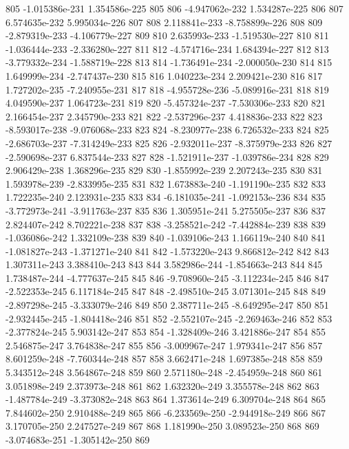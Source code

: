 \documentclass{article}
\begin{document}
\begin{Schunk}
\begin{Soutput}
805  -1.015386e-231  1.354586e-225  805
806  -4.947062e-232  1.534287e-225  806
807   6.574635e-232  5.995034e-226  807
808   2.118841e-233 -8.758899e-226  808
809  -2.879319e-233 -4.106779e-227  809
810   2.635993e-233 -1.519530e-227  810
811  -1.036444e-233 -2.336280e-227  811
812  -4.574716e-234  1.684394e-227  812
813  -3.779332e-234 -1.588719e-228  813
814  -1.736491e-234 -2.000050e-230  814
815   1.649999e-234 -2.747437e-230  815
816   1.040223e-234  2.209421e-230  816
817   1.727202e-235 -7.240955e-231  817
818  -4.955728e-236 -5.089916e-231  818
819   4.049590e-237  1.064723e-231  819
820  -5.457324e-237 -7.530306e-233  820
821   2.166454e-237  2.345790e-233  821
822  -2.537296e-237  4.418836e-233  822
823  -8.593017e-238 -9.076068e-233  823
824  -8.230977e-238  6.726532e-233  824
825  -2.686703e-237 -7.314249e-233  825
826  -2.932011e-237 -8.375979e-233  826
827  -2.590698e-237  6.837544e-233  827
828  -1.521911e-237 -1.039786e-234  828
829   2.906429e-238  1.368296e-235  829
830  -1.855992e-239  2.207243e-235  830
831   1.593978e-239 -2.833995e-235  831
832   1.673883e-240 -1.191190e-235  832
833   1.722235e-240  2.123931e-235  833
834  -6.181035e-241 -1.092153e-236  834
835  -3.772973e-241 -3.911763e-237  835
836   1.305951e-241  5.275505e-237  836
837   2.824407e-242  8.702221e-238  837
838  -3.258521e-242 -7.442884e-239  838
839  -1.036086e-242  1.332109e-238  839
840  -1.039106e-243  1.166119e-240  840
841  -1.081827e-243 -1.371271e-240  841
842  -1.573220e-243  9.866812e-242  842
843   1.307311e-243  3.388410e-243  843
844   3.582986e-244 -1.854663e-243  844
845   1.738487e-244 -4.777637e-245  845
846  -9.708960e-245 -3.112234e-245  846
847  -2.522353e-245  6.117184e-245  847
848  -2.498510e-245  3.071301e-245  848
849  -2.897298e-245 -3.333079e-246  849
850   2.387711e-245 -8.649295e-247  850
851  -2.932445e-245 -1.804418e-246  851
852  -2.552107e-245 -2.269463e-246  852
853  -2.377824e-245  5.903142e-247  853
854  -1.328409e-246  3.421886e-247  854
855   2.546875e-247  3.764838e-247  855
856  -3.009967e-247  1.979341e-247  856
857   8.601259e-248 -7.760344e-248  857
858   3.662471e-248  1.697385e-248  858
859   5.343512e-248  3.564867e-248  859
860   2.571180e-248 -2.454959e-248  860
861   3.051898e-249  2.373973e-248  861
862   1.632320e-249  3.355578e-248  862
863  -1.487784e-249 -3.373082e-248  863
864   1.373614e-249  6.309704e-248  864
865   7.844602e-250  2.910488e-249  865
866  -6.233569e-250 -2.944918e-249  866
867   3.170705e-250  2.247527e-249  867
868   1.181990e-250  3.089523e-250  868
869  -3.074683e-251 -1.305142e-250  869

\end{Soutput}
\end{Schunk}
\end{document}
